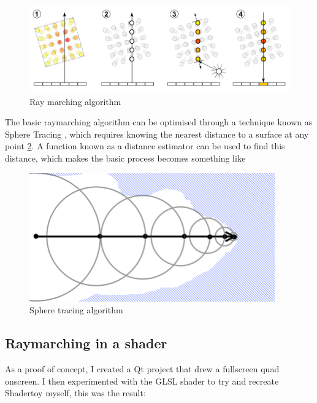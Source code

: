\documentclass[11pt,a4paper,final,notitlepage]{report}
\begin{document}
\begin{figure}
\begin{center}
\includegraphics[width=\textwidth]{images/raymarchstep}
\caption{Ray marching algorithm}
\label{fig:raymarching}
\end{center}
\end{figure}

The basic raymarching algorithm can be optimised through a technique known as Sphere Tracing \cite{Hart1996}, which requires knowing the nearest distance to a surface at any point \ref{fig:sphere_tracing}. A function known as a distance estimator can be used to find this distance, which makes the basic process becomes something like 

\begin{figure}
\begin{center}
\includegraphics[width=\textwidth]{images/spheretracing}
\caption{Sphere tracing algorithm}
\label{fig:sphere_tracing}
\end{center}
\end{figure}



\subsection{Raymarching in a shader}

As a proof of concept, I created a Qt project that drew a fullscreen quad onscreen. I then experimented with the GLSL shader to try and recreate Shadertoy myself, this was the result:
\end{document}
